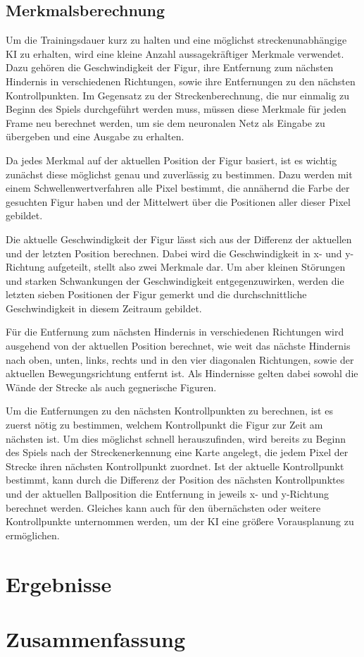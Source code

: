 \documentclass[11pt,final,journal,a4paper,towside,towcolumn]{IEEEtran}
\begin{document}
\subsection{Merkmalsberechnung}
Um die Trainingsdauer kurz zu halten und eine möglichst streckenunabhängige KI zu erhalten, wird eine kleine Anzahl aussagekräftiger Merkmale verwendet. Dazu gehören die Geschwindigkeit der Figur, ihre Entfernung zum nächsten Hindernis in verschiedenen Richtungen, sowie ihre Entfernungen zu den nächsten Kontrollpunkten. Im Gegensatz zu der Streckenberechnung, die nur einmalig zu Beginn des Spiels durchgeführt werden muss, müssen diese Merkmale für jeden Frame neu berechnet werden, um sie dem neuronalen Netz als Eingabe zu übergeben und eine Ausgabe zu erhalten.

Da jedes Merkmal auf der aktuellen Position der Figur basiert, ist es wichtig zunächst diese möglichst genau und zuverlässig zu bestimmen. Dazu werden mit einem Schwellenwertverfahren alle Pixel bestimmt, die annähernd die Farbe der gesuchten Figur haben und der Mittelwert über die Positionen aller dieser Pixel gebildet.

Die aktuelle Geschwindigkeit der Figur lässt sich aus der Differenz der aktuellen und der letzten Position berechnen. Dabei wird die Geschwindigkeit in x- und y-Richtung aufgeteilt, stellt also zwei Merkmale dar. Um aber kleinen Störungen und starken Schwankungen der Geschwindigkeit entgegenzuwirken, werden die letzten sieben Positionen der Figur gemerkt und die durchschnittliche Geschwindigkeit in diesem Zeitraum gebildet.

Für die Entfernung zum nächsten Hindernis in verschiedenen Richtungen wird ausgehend von der aktuellen Position berechnet, wie weit das nächste Hindernis nach oben, unten, links, rechts und in den vier diagonalen Richtungen, sowie der aktuellen Bewegungsrichtung entfernt ist. Als Hindernisse gelten dabei sowohl die Wände der Strecke als auch gegnerische Figuren.

Um die Entfernungen zu den nächsten Kontrollpunkten zu berechnen, ist es zuerst nötig zu bestimmen, welchem Kontrollpunkt die Figur zur Zeit am nächsten ist. Um dies möglichst schnell herauszufinden, wird bereits zu Beginn des Spiels nach der Streckenerkennung eine Karte angelegt, die jedem Pixel der Strecke ihren nächsten Kontrollpunkt zuordnet. Ist der aktuelle Kontrollpunkt bestimmt, kann durch die Differenz der Position des nächsten Kontrollpunktes und der aktuellen Ballposition die Entfernung in jeweils x- und y-Richtung berechnet werden. Gleiches kann auch für den übernächsten oder weitere Kontrollpunkte unternommen werden, um der KI eine größere Vorausplanung zu ermöglichen.


\section{Ergebnisse}

\section{Zusammenfassung}

{}

\end{document}
